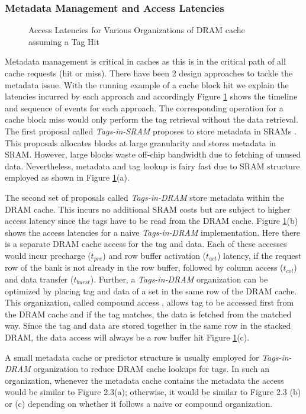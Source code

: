 \subsubsection{Metadata Management and Access Latencies}
\begin{figure}[!htb]
	\centering
	\def\svgwidth{\columnwidth}
	
	\caption{Access Latencies for Various Organizations of DRAM cache assuming a Tag Hit}
	\label{fig:dramcache-lat}
\end{figure}
Metadata management is critical in caches as this is in the critical path of all cache requests (hit or miss). There have been 2 design approaches to tackle the metadata issue. With the running example of a cache block hit we explain the latencies incurred by each approach and accordingly Figure \ref{fig:dramcache-lat} shows the timeline and sequence of events for each approach. The corresponding operation for a cache block miss would only perform the tag retrieval without the data retrieval. The first proposal called \textit{Tags-in-SRAM} proposes to store metadata in SRAMs \cite{footprint}. This proposals allocates blocks at large granularity and stores metadata in SRAM. However, large blocks waste off-chip bandwidth due to fetching of unused data. Nevertheless, metadata and tag lookup is fairy fast due to SRAM structure employed as shown in Figure \ref{fig:dramcache-lat}(a). 
\par The second set of proposals called \textit{Tags-in-DRAM} \cite{loh-hill,alloy,bimodal,atcache} store metadata within the DRAM cache. This incurs no additional SRAM costs but are subject to higher access latency since the tags have to be read from the DRAM cache. Figure \ref{fig:dramcache-lat}(b) shows the access latencies for a naive \textit{Tags-in-DRAM} implementation. Here there is a separate DRAM cache access for the tag and data. Each of these accesses would incur precharge ($t_{pre}$) and row buffer activation ($t_{act}$) latency, if the request row of the bank is not already in the row buffer, followed by column access ($t_{col}$) and data transfer ($t_{burst}$). Further, a \textit{Tags-in-DRAM} organization can be optimized by placing tag and data of a set in the same row of the DRAM cache. This organization, called compound access \cite{loh-hill}, allows tag to be accessed first from the DRAM cache and if the tag matches, the data is fetched from the matched way. Since the tag and data are stored together in the same row in the stacked DRAM, the data access will always be a row buffer hit Figure \ref{fig:dramcache-lat}(c). 
\par A small metadata cache \cite{atcache} or predictor \cite{loh-hill} structure is usually employed for \textit{Tags-in-DRAM} organization to reduce DRAM cache lookups for tags. In such an organization, whenever the metadata cache contains the metadata the access would be similar to Figure 2.3(a); otherwise, it would be similar to Figure 2.3 (b) or (c) depending on whether it follows a naive or compound organization. 
